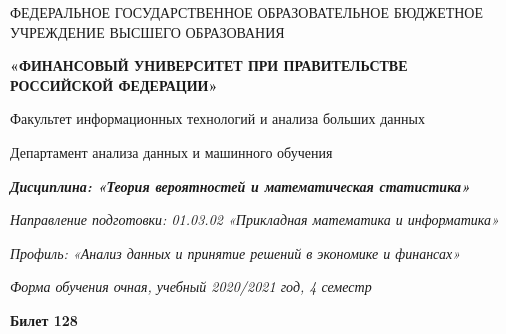 \documentclass[a4paper,14pt]{article}
\begin{document}
\begin{center}
ФЕДЕРАЛЬНОЕ ГОСУДАРСТВЕННОЕ ОБРАЗОВАТЕЛЬНОЕ БЮДЖЕТНОЕ УЧРЕЖДЕНИЕ ВЫСШЕГО ОБРАЗОВАНИЯ

    \textbf{«ФИНАНСОВЫЙ УНИВЕРСИТЕТ ПРИ ПРАВИТЕЛЬСТВЕ РОССИЙСКОЙ ФЕДЕРАЦИИ»}

Факультет информационных технологий и анализа больших данных

Департамент анализа данных и машинного обучения

\textit{
	\textbf{Дисциплина: «Теория вероятностей и математическая статистика»}}

\textit{Направление подготовки: 01.03.02 «Прикладная математика и информатика»}

\textit{Профиль: «Анализ данных и принятие решений в экономике и финансах»}

\textit{Форма обучения очная, учебный 2020/2021 год, 4 семестр}

\textbf{Билет 128}

\end{center}
\end{document}
